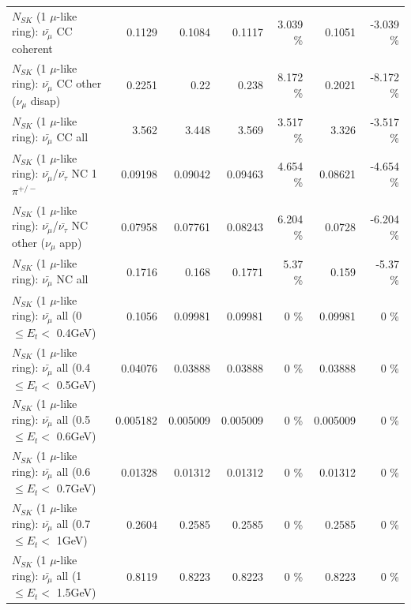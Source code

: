 \begin{table}
\begin{tabular}{| l | r | r | r  r | r  r |}
                       $N_{SK}$ (1 $\mu$-like ring): $\bar{\nu_\mu}$ CC coherent &          0.1129 &          0.1084 &          0.1117 &    3.039 \%  &          0.1051 &   -3.039 \%  \\ 
        $N_{SK}$ (1 $\mu$-like ring): $\bar{\nu_\mu}$ CC other ($\nu_\mu$ disap) &          0.2251 &            0.22 &           0.238 &    8.172 \%  &          0.2021 &   -8.172 \%  \\ 
                          $N_{SK}$ (1 $\mu$-like ring): $\bar{\nu_{\mu}}$ CC all &           3.562 &           3.448 &           3.569 &    3.517 \%  &           3.326 &   -3.517 \%  \\ 
\hline
  $N_{SK}$ (1 $\mu$-like ring): $\bar{\nu_\mu}$/$\bar{\nu_\tau}$ NC 1$\pi^{+/-}$ &         0.09198 &         0.09042 &         0.09463 &    4.654 \%  &         0.08621 &   -4.654 \%  \\ 
$N_{SK}$ (1 $\mu$-like ring): $\bar{\nu_\mu}$/$\bar{\nu_\tau}$ NC other ($\nu_\mu$ app) &         0.07958 &         0.07761 &         0.08243 &    6.204 \%  &          0.0728 &   -6.204 \%  \\ 
                          $N_{SK}$ (1 $\mu$-like ring): $\bar{\nu_{\mu}}$ NC all &          0.1716 &           0.168 &          0.1771 &     5.37 \%  &           0.159 &    -5.37 \%  \\ 
\hline
   $N_{SK}$ (1 $\mu$-like ring): $\bar{\nu_{\mu}}$ all (0 $\leq E_{t} <$ 0.4GeV) &          0.1056 &         0.09981 &         0.09981 &        0 \%  &         0.09981 &        0 \%  \\ 
 $N_{SK}$ (1 $\mu$-like ring): $\bar{\nu_{\mu}}$ all (0.4 $\leq E_{t} <$ 0.5GeV) &         0.04076 &         0.03888 &         0.03888 &        0 \%  &         0.03888 &        0 \%  \\ 
 $N_{SK}$ (1 $\mu$-like ring): $\bar{\nu_{\mu}}$ all (0.5 $\leq E_{t} <$ 0.6GeV) &        0.005182 &        0.005009 &        0.005009 &        0 \%  &        0.005009 &        0 \%  \\ 
 $N_{SK}$ (1 $\mu$-like ring): $\bar{\nu_{\mu}}$ all (0.6 $\leq E_{t} <$ 0.7GeV) &         0.01328 &         0.01312 &         0.01312 &        0 \%  &         0.01312 &        0 \%  \\ 
   $N_{SK}$ (1 $\mu$-like ring): $\bar{\nu_{\mu}}$ all (0.7 $\leq E_{t} <$ 1GeV) &          0.2604 &          0.2585 &          0.2585 &        0 \%  &          0.2585 &        0 \%  \\ 
   $N_{SK}$ (1 $\mu$-like ring): $\bar{\nu_{\mu}}$ all (1 $\leq E_{t} <$ 1.5GeV) &          0.8119 &          0.8223 &          0.8223 &        0 \%  &          0.8223 &        0 \%  \\ 

\end{tabular}
\end{table}
